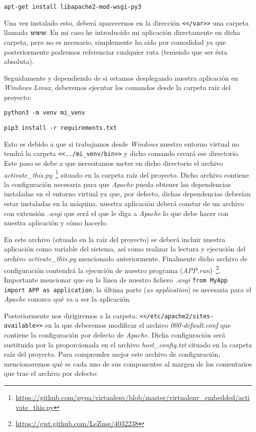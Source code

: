 \noindent\verb|apt-get install libapache2-mod-wsgi-py3|

Una vez instalado esto, deberá aparecernos en la dirección \texttt{<</var>>} una carpeta llamada \textbf{\textit{www}}. En mi caso he introducido mi aplicación directamente en dicha carpeta, pero no es necesario, simplemente ha sido por comodidad ya que posteriormente podremos referenciar cualquier ruta (teniendo que ser ésta absoluta).

Seguidamente y dependiendo de si estamos desplegando nuestra aplicación en \textit{Windows} \textit{Linux}, deberemos ejecutar los comandos desde la carpeta raíz del proyecto:

\noindent\verb|python3 -m venv mi_venv|

\noindent\verb|pip3 install -r requirements.txt|

Esto es debido a que si trabajamos desde \textit{Windows} nuestro entorno virtual no tendrá la carpeta \texttt{<<../mi\_venv/bin>>} y dicho comando creará ese directorio. Este paso se debe a que necesitamos meter en dicho directorio el archivo \textit{activate\_this.py}~\footnote{\url{https://github.com/pypa/virtualenv/blob/master/virtualenv\_embedded/activate\_this.py}} situado en la carpeta raíz del proyecto. Dicho archivo contiene la configuración necesaria para que \textit{Apache} pueda obtener las dependencias instaladas en el entorno virtual ya que, por defecto, dichas dependencias deberían estar instaladas en la máquina. nuestra aplicación deberá constar de un archivo con extensión \textit{.wsgi} que será el que le diga a \textit{Apache} lo que debe hacer con nuestra aplicación y cómo hacerlo.

En este archivo (situado en la raíz del proyecto) se deberá incluir nuestra aplicación como variable del sistema, así como realizar la lectura y ejecución del archivo \textit{activate\_this.py} mencionado anteriormente. Finalmente dicho archivo de configuración contendrá la ejecución de nuestro programa (\textit{APP.run})~\footnote{\url{https://gist.github.com/LeZuse/4032238}}. Importante mencionar que en la línea de nuestro fichero \textit{.wsgi} \noindent\verb|from MyApp import APP as application|, la última parte (\textit{as application}) es necesaria para el \textit{Apache} conozca qué va a ser la aplicación.

Posteriormente nos dirigiremos a la carpeta: \texttt{<</etc/apache2/sites-available>>} en la que deberemos modificar el archivo \textit{000-default.conf} que contiene la configuración por defecto de \textit{Apache}. Dicha configuración será sustituida por la proporcionada en el archivo \textit{host\_config.txt} situado en la carpeta raíz del proyecto. Para comprender mejor este archivo de configuración, mencionaremos qué es cada uno de sus componentes al margen de los comentarios que trae el archivo por defecto:

